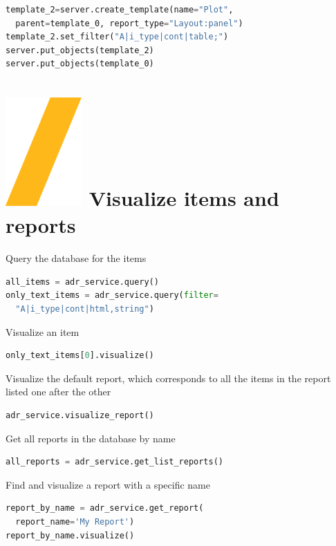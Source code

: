 \documentclass[9pt,landscape]{article}
\begin{document}
\begin{multicols}{3}
\begin{lstlisting}[language=Python]
template_2=server.create_template(name="Plot", 
  parent=template_0, report_type="Layout:panel")
template_2.set_filter("A|i_type|cont|table;")
server.put_objects(template_2)
server.put_objects(template_0)
\end{lstlisting}

\section{\includegraphics[height=\fontcharht\font`\S]{slash.png}  Visualize items and reports}
Query the database for the items
\begin{lstlisting}[language=Python]
all_items = adr_service.query()
only_text_items = adr_service.query(filter=
  "A|i_type|cont|html,string")
\end{lstlisting}
Visualize an item
\begin{lstlisting}[language=Python]
only_text_items[0].visualize()
\end{lstlisting}

Visualize the default report, which corresponds to all the items in the report listed one after the other
\begin{lstlisting}[language=Python]
adr_service.visualize_report()
\end{lstlisting}
Get all reports in the database by name
\begin{lstlisting}[language=Python]
all_reports = adr_service.get_list_reports()
\end{lstlisting}
Find and visualize a report with a specific name
\begin{lstlisting}[language=Python]
report_by_name = adr_service.get_report(
  report_name='My Report')
report_by_name.visualize()
\end{lstlisting}



\end{multicols}
\end{document}
